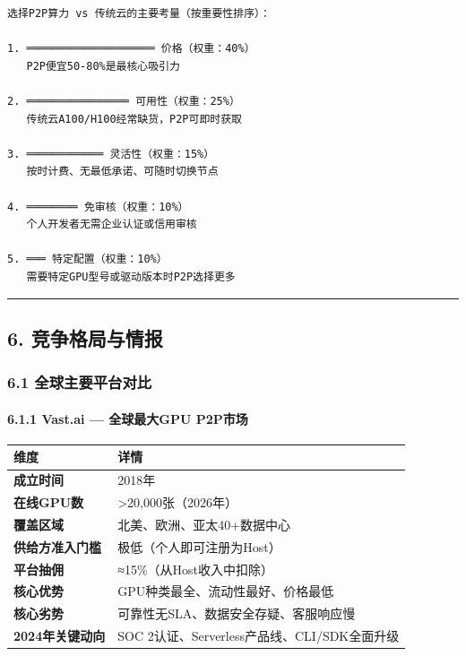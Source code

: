 \documentclass[UTF8,a4paper,12pt]{ctexart}
\begin{document}
\begin{verbatim}
选择P2P算力 vs 传统云的主要考量（按重要性排序）：

1. ════════════════════ 价格（权重：40%）
   P2P便宜50-80%是最核心吸引力

2. ════════════════ 可用性（权重：25%）
   传统云A100/H100经常缺货，P2P可即时获取

3. ════════════ 灵活性（权重：15%）
   按时计费、无最低承诺、可随时切换节点

4. ════════ 免审核（权重：10%）
   个人开发者无需企业认证或信用审核

5. ═══ 特定配置（权重：10%）
   需要特定GPU型号或驱动版本时P2P选择更多
\end{verbatim}

\begin{center}\rule{0.5\linewidth}{0.5pt}\end{center}

\pagebreak

\subsection{6.
竞争格局与情报}\label{ux7adeux4e89ux683cux5c40ux4e0eux60c5ux62a5}

\subsubsection{6.1
全球主要平台对比}\label{ux5168ux7403ux4e3bux8981ux5e73ux53f0ux5bf9ux6bd4}

\paragraph{6.1.1 Vast.ai --- 全球最大GPU
P2P市场}\label{vast.ai-ux5168ux7403ux6700ux5927gpu-p2pux5e02ux573a}

{\def\LTcaptype{none} %
\begin{longtable}[]{@{}ll@{}}
\toprule\noalign{}
维度 & 详情 \\
\midrule\noalign{}
\endhead
\bottomrule\noalign{}
\endlastfoot
\textbf{成立时间} & 2018年 \\
\textbf{在线GPU数} & \textgreater20,000张（2026年） \\
\textbf{覆盖区域} & 北美、欧洲、亚太40+数据中心 \\
\textbf{供给方准入门槛} & 极低（个人即可注册为Host） \\
\textbf{平台抽佣} & ≈15\%（从Host收入中扣除） \\
\textbf{核心优势} & GPU种类最全、流动性最好、价格最低 \\
\textbf{核心劣势} & 可靠性无SLA、数据安全存疑、客服响应慢 \\
\textbf{2024年关键动向} & SOC
2认证、Serverless产品线、CLI/SDK全面升级 \\
\end{longtable}
}
\end{document}

